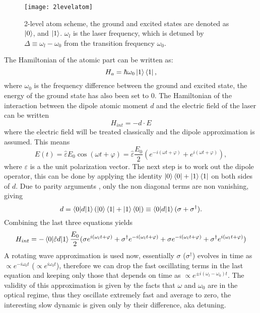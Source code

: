 \begin{figure}
\centering
\texttt{[image: 2levelatom]}
\caption{2-level atom scheme, the ground and excited states are denoted as $\ket{0}$, and $\ket{1}$. $\omega_l$ is the laser frequency, which is detuned by $\Delta \equiv \omega_l - \omega_0$ from the transition frequency $\omega_0$.}
\label{2levelatom}
\end{figure}
The Hamiltonian of the atomic part can be written as:
\begin{equation}
H_a = \hbar\omega_0 \ket{1}\bra{1},
\end{equation}
where $\omega_0$ is the frequency difference between the ground and excited state, the energy of the ground state has also been set to 0. The Hamiltonian of the interaction between the dipole atomic moment $d$ and the electric field of the laser can be written \cite{steck}
\begin{equation}
H_{int} = -d\cdot E
\end{equation}
where the electric field will be treated classically and the dipole approximation is assumed. This means
\begin{equation}
E(t) = \hat{\varepsilon} E_0 \cos(\omega t+\varphi) = \hat{\varepsilon} \frac{E_0}{2} \left(e^{-i(\omega t+\varphi)} + e^{i(\omega t+\varphi)}\right),
\end{equation}
where $\varepsilon$ is a the unit polarization vector. The next step is to work out the dipole operator, this can be done by applying the identity $\ket{0}\bra{0} + \ket{1}\bra{1}$ on both sides of $d$. Due to parity arguments \cite{steck}, only the non diagonal terms are non vanishing, giving
\begin{equation}
d = \braket{0|d|1}\left(\ket{0}\bra{1} + \ket{1}\bra{0}\right) \equiv \braket{0|d|1}(\sigma + \sigma^\dagger).
\end{equation}
Combining the last three equations yields
\begin{equation}
H_{int} = - \braket{0|\hat{\varepsilon} d|1}\frac{E_0}{2}(\sigma e^{i(\omega_l t+\varphi)} + \sigma^\dagger e^{-i(\omega_l t+\varphi)} + \sigma e^{-i(\omega_l t+\varphi)} + \sigma^\dagger e^{i(\omega_l t+\varphi)})
\end{equation}
A rotating wave approximation is used now, essentially $\sigma$ ($\sigma^\dagger$) evolves in time as $\propto e^{-i\omega_0 t}$ ($\propto e^{i\omega_0 t}$), therefore we can drop the fast oscillating terms in the last equation and keeping only those that depends on time as $\propto e^{\pm i(\omega_l-\omega_0 )t}$. The validity of this approximation is given by the facts that $\omega$ and $\omega_0$ are in the optical regime, thus they oscillate extremely fast and average to zero, the interesting slow dynamic is given only by their difference, aka detuning.
